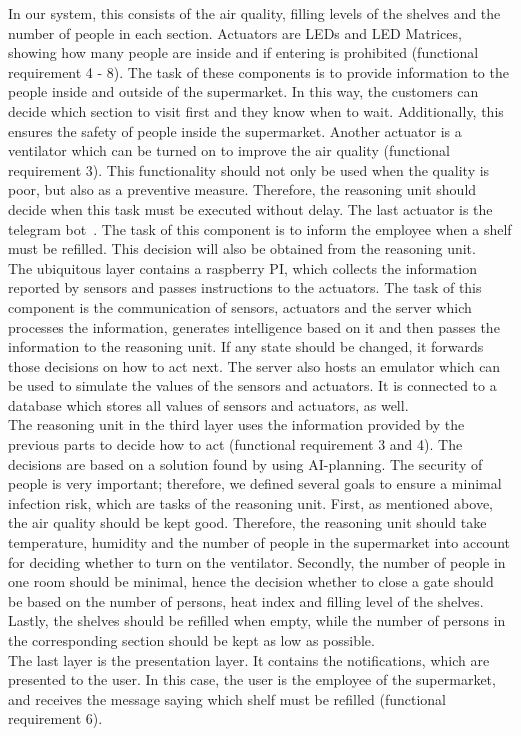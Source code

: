 \documentclass[runningheads]{llncs}
\begin{document}
	In our system, this consists of the air quality, filling levels of the shelves and the number of people in each section. 
	Actuators are LEDs and LED Matrices, showing how many people are inside and if entering is prohibited (functional requirement 4 - 8).
	The task of these components is to provide information to the people inside and outside of the supermarket. 
	In this way, the customers can decide which section to visit first and they know when to wait.
	Additionally, this ensures the safety of people inside the supermarket.
	Another actuator is a ventilator which can be turned on to improve the air quality (functional requirement 3).
	This functionality should not only be used when the quality is poor, but also as a preventive measure. 
	Therefore, the reasoning unit should decide when this task must be executed without delay. 
	The last actuator is the telegram bot~\cite{telegram}. 
	The task of this component is to inform the employee when a shelf must be refilled. 
	This decision will also be obtained from the reasoning unit.
	\\ \linebreak
	The ubiquitous layer contains a raspberry PI, which collects the information reported by sensors and passes instructions to the actuators. 
	The task of this component is the communication of sensors, actuators and the server which processes the information, generates intelligence based on it and then passes the information to the reasoning unit.
	If any state should be changed, it forwards those decisions on how to act next. 
	The server also hosts an emulator which can be used to simulate the values of the sensors and actuators. 
	It is connected to a database which stores all values of sensors and actuators, as well.
	\\ \linebreak
	The reasoning unit in the third layer uses the information provided by the previous parts to decide how to act (functional requirement 3 and 4). 
	The decisions are based on a solution found by using AI-planning. 
	The security of people is very important; therefore, we defined several goals to ensure a minimal infection risk, which are tasks of the reasoning unit. 
	First, as mentioned above, the air quality should be kept good. 
	Therefore, the reasoning unit should take temperature, humidity and the number of people in the supermarket into account for deciding whether to turn on the ventilator. 
	Secondly, the number of people in one room should be minimal, hence the decision whether to close a gate should be based on the number of persons, heat index and filling level of the shelves. 
	Lastly, the shelves should be refilled when empty, while the number of persons in the corresponding section should be kept as low as possible. \\ \linebreak
	The last layer is the presentation layer.
	It contains the notifications, which are presented to the user. 
	In this case, the user is the employee of the supermarket, and receives the message saying which shelf must be refilled (functional requirement 6). 
	
\end{document}
